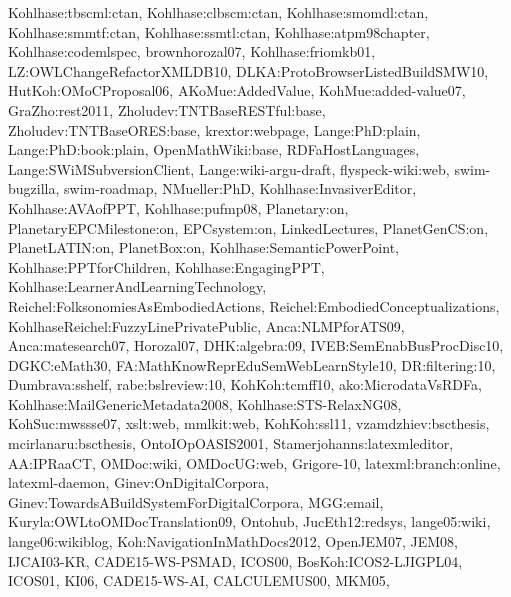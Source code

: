 {Kohlhase:tbscml:ctan,
Kohlhase:clbscm:ctan,
Kohlhase:smomdl:ctan,
Kohlhase:smmtf:ctan,
Kohlhase:ssmtl:ctan,
Kohlhase:atpm98chapter,
Kohlhase:codemlspec,
brownhorozal07,
Kohlhase:friomkb01,
LZ:OWLChangeRefactorXMLDB10,
DLKA:ProtoBrowserListedBuildSMW10,
HutKoh:OMoCProposal06,
AKoMue:AddedValue,
KohMue:added-value07,
GraZho:rest2011,
Zholudev:TNTBaseRESTful:base,
Zholudev:TNTBaseORES:base,
krextor:webpage,
Lange:PhD:plain,
Lange:PhD:book:plain,
OpenMathWiki:base,
RDFaHostLanguages,
Lange:SWiMSubversionClient,
Lange:wiki-argu-draft,
flyspeck-wiki:web,
swim-bugzilla,
swim-roadmap,
NMueller:PhD,
Kohlhase:InvasiverEditor,
Kohlhase:AVAofPPT,
Kohlhase:pufmp08,
Planetary:on,
PlanetaryEPCMilestone:on,
EPCsystem:on,
LinkedLectures,
PlanetGenCS:on, 
PlanetLATIN:on,
PlanetBox:on,
Kohlhase:SemanticPowerPoint,
Kohlhase:PPTforChildren,
Kohlhase:EngagingPPT,
Kohlhase:LearnerAndLearningTechnology,
Reichel:FolksonomiesAsEmbodiedActions,
Reichel:EmbodiedConceptualizations,
KohlhaseReichel:FuzzyLinePrivatePublic,
Anca:NLMPforATS09,
Anca:matesearch07,
Horozal07,
DHK:algebra:09,
IVEB:SemEnabBusProcDisc10,
DGKC:eMath30,
FA:MathKnowReprEduSemWebLearnStyle10,
DR:filtering:10,
Dumbrava:sshelf,
rabe:bslreview:10,
KohKoh:tcmff10,
ako:MicrodataVsRDFa,
Kohlhase:MailGenericMetadata2008,
Kohlhase:STS-RelaxNG08,
KohSuc:mwssse07,
xslt:web,
mmlkit:web,
KohKoh:ssl11,
vzamdzhiev:bscthesis,
mcirlanaru:bscthesis,
OntoIOpOASIS2001,
Stamerjohanns:latexmleditor,
AA:IPRaaCT,
OMDoc:wiki,
OMDocUG:web,
Grigore-10,
latexml:branch:online,
latexml-daemon,
Ginev:OnDigitalCorpora,
Ginev:TowardsABuildSystemForDigitalCorpora,
MGG:email,
Kuryla:OWLtoOMDocTranslation09,
Ontohub,
JucEth12:redsys,
lange05:wiki,
lange06:wikiblog,
Koh:NavigationInMathDocs2012,
OpenJEM07,
JEM08,
IJCAI03-KR,
CADE15-WS-PSMAD,
ICOS00,
BosKoh:ICOS2-LJIGPL04,
ICOS01,
KI06,
CADE15-WS-AI,
CALCULEMUS00,
MKM05,
}
